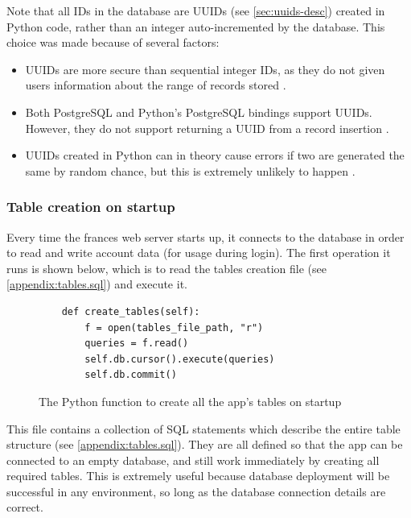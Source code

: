 \documentclass[12pt, letterpaper]{article}
\begin{document}
Note that all IDs in the database are UUIDs (see \ref{sec:uuids-desc}) created in Python code, rather than an integer auto-incremented by the database. This choice was made because of several factors:
\begin{itemize}
\item UUIDs are more secure than sequential integer IDs, as they do not given users information about the range of records stored \cite{uuids-compare}.
\item Both PostgreSQL and Python's PostgreSQL bindings support UUIDs. However, they do not support returning a UUID from a record insertion \cite{uuids-support}.
\item UUIDs created in Python can in theory cause errors if two are generated the same by random chance, but this is extremely unlikely to happen \cite{uuids-what-is}.
\end{itemize}

\subsubsection{Table creation on startup}\label{sec:impl-database-creation}

Every time the frances web server starts up, it connects to the database in order to read and write account data (for usage during login). The first operation it runs is shown below, which is to read the tables creation file (see \ref{appendix:tables.sql}) and execute it.

\begin{flushleft}
\begin{figure}[H]
\begin{verbatim}
    def create_tables(self):
        f = open(tables_file_path, "r")
        queries = f.read()
        self.db.cursor().execute(queries)
        self.db.commit()
\end{verbatim}
\caption{The Python function to create all the app's tables on startup}
\end{figure}
\end{flushleft}

This file contains a collection of SQL statements which describe the entire table structure (see \ref{appendix:tables.sql}). They are all defined so that the app can be connected to an empty database, and still work immediately by creating all required tables. This is extremely useful because database deployment will be successful in any environment, so long as the database connection details are correct.
\end{document}
